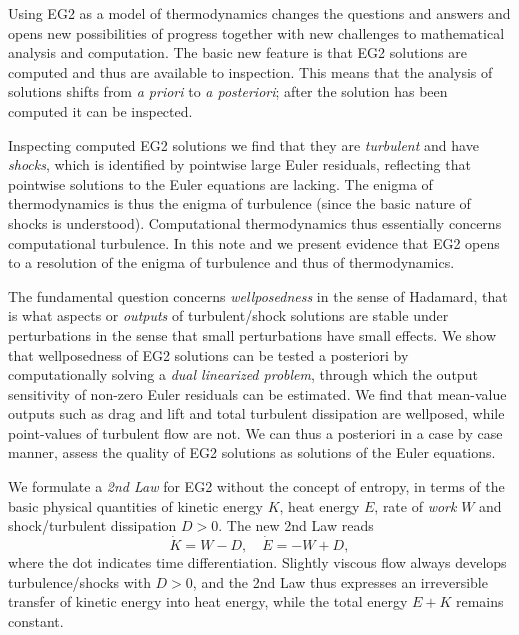 Using EG2 as a model of thermodynamics changes the questions and
answers and opens new possibilities of progress together with new
challenges to mathematical analysis and computation.  The basic new
feature is that EG2 solutions are computed and thus are available to
inspection. This means that the analysis of solutions shifts from
\emph{a priori} to \emph{a posteriori}; after the solution has been
computed it can be inspected.

Inspecting computed EG2 solutions we find that they are
\emph{turbulent} and have \emph{shocks}, which is identified by
pointwise large Euler residuals, reflecting that pointwise solutions
to the Euler equations are lacking. The enigma of thermodynamics is
thus the enigma of turbulence (since the basic nature of shocks is
understood). Computational thermodynamics thus essentially concerns
computational turbulence. In this note and \cite{ambsthermo} we
present evidence that EG2 opens to a resolution of the enigma of
turbulence and thus of thermodynamics.
 
The fundamental question concerns \emph{wellposedness} in the sense of
Hadamard, that is what aspects or \emph{outputs} of turbulent/shock
solutions are stable under perturbations in the sense that small
perturbations have small effects. We show that wellposedness of EG2
solutions can be tested a posteriori by computationally solving a
\emph{dual linearized problem}, through which the output sensitivity
of non-zero Euler residuals can be estimated. We find that mean-value
outputs such as drag and lift and total turbulent dissipation are
wellposed, while point-values of turbulent flow are not. We can thus a
posteriori in a case by case manner, assess the quality of EG2
solutions as solutions of the Euler equations.

We formulate a \emph{2nd Law} for EG2 
without the concept of entropy, in terms of  
the basic physical quantities of kinetic energy
$K$, heat energy $E$, rate of \emph{work} $W$ and shock/turbulent dissipation
$D>0$. The new 2nd Law reads
\begin{equation}\label{secondlaw}
\dot K=W-D,\quad \dot E=-W+D,
\end{equation}
where the dot indicates time differentiation. Slightly viscous
flow always develops turbulence/shocks with $D>0$, and the  
2nd Law thus expresses an irreversible transfer of kinetic energy
into heat energy, while the total energy $E+K$ remains constant.

